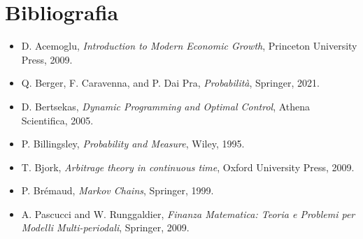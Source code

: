 \documentclass[11pt, a4paper]{report}
\theoremstyle{plain}
\theoremstyle{definition}
\theoremstyle{remark}
\newcommand{\1}{\mathbf{1}}
\begin{document}
\chapter*{Bibliografia}
\begin{itemize}
    \item [1] D. Acemoglu, \emph{Introduction to Modern Economic Growth}, Princeton University Press, 2009.
    \item [2] Q. Berger, F. Caravenna, and P. Dai Pra, \emph{Probabilità}, Springer, 2021.
    \item [3] D. Bertsekas, \emph{Dynamic Programming and Optimal Control}, Athena Scientifica, 2005.
    \item [5] P. Billingsley, \emph{Probability and Measure}, Wiley, 1995.
    \item [6] T. Bjork, \emph{Arbitrage theory in continuous time}, Oxford University Press, 2009.
    \item [7] P. Brémaud, \emph{Markov Chains}, Springer, 1999.
    \item [13] A. Pascucci and W. Runggaldier, \emph{Finanza Matematica: Teoria e Problemi per Modelli Multi-periodali}, Springer, 2009.
\end{itemize}
\end{document}

